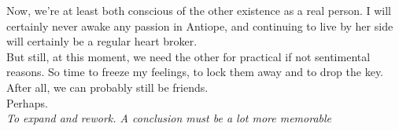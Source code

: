 \documentclass{report}
\newcommand{\dcomment}[1]{
	\emph{#1}
	\\
}
\begin{document}
Now, we're at least both conscious of the other existence as a real person. I will certainly never awake any passion in Antiope, and continuing to live by her side will certainly be a regular heart broker.\\

But still, at this moment, we need the other for practical if not sentimental reasons. So time to freeze my feelings, to lock them away and to drop the key.\\

After all, we can probably still be friends.\\

Perhaps.\\

\dcomment{
	To expand and rework. A conclusion must be a lot more memorable
}
\end{document}
